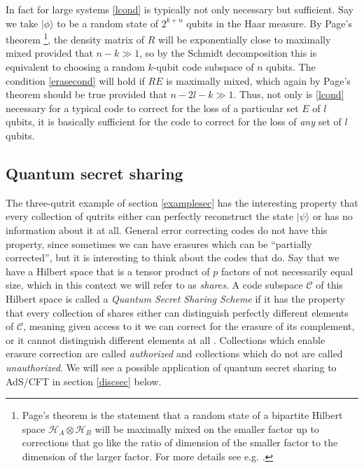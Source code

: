 \documentclass[12pt]{article}
\newcommand{\ran}{\rangle}
\begin{document}
In fact for large systems \eqref{lcond} is typically not only necessary but sufficient.  Say we take $|\phi\ran$ to be a random state of $2^{k+n}$ qubits in the Haar measure.  By Page's theorem \cite{Page:1993df}\footnote{Page's theorem is the statement that a random state of a bipartite Hilbert space $\mathcal{H}_A\otimes \mathcal{H}_B$ will be maximally mixed on the smaller factor up to corrections that go like the ratio of dimension of the smaller factor to the dimension of the larger factor.  For more details see e.g. \cite{Harlow:2014yka}.}, the density matrix of $R$ will be exponentially close to maximally mixed provided that $n-k\gg 1$, so by the Schmidt decomposition this is equivalent to choosing a random $k$-qubit code subspace of $n$ qubits.  The condition \eqref{erasecond} will hold if $RE$ is maximally mixed, which again by Page's theorem should be true provided that $n-2l-k \gg 1$. Thus, not only is \eqref{lcond} necessary for a typical code to correct for the loss of a particular set $E$ of $l$ qubits, it is basically sufficient for the code to correct for the loss of \textit{any} set of $l$ qubits.   

\subsection{Quantum secret sharing}\label{qsssec}
The three-qutrit example of section \ref{examplesec} has the interesting property that every collection of qutrits either can perfectly reconstruct the state $|\psi\ran$ or has no information about it at all.  General error correcting codes do not have this property, since sometimes we can have erasures which can be ``partially corrected'', but it is interesting to think about the codes that do. Say that we have a Hilbert space that is a tensor product of $p$ factors of not necessarily equal size, which in this context we will refer to as \textit{shares}.  A code subspace $\mathcal{C}$ of this Hilbert space is called a \textit{Quantum Secret Sharing Scheme} if it has the property that every collection of shares either can distinguish perfectly different elements of $\mathcal{C}$, meaning given access to it we can correct for the erasure of its complement, or it cannot distinguish different elements at all \cite{Cleve:1999qg}.  Collections which enable erasure correction are called \textit{authorized} and collections which do not are called \textit{unauthorized}.  We will see a possible application of quantum secret sharing to AdS/CFT in section \ref{discsec} below.
\end{document}
